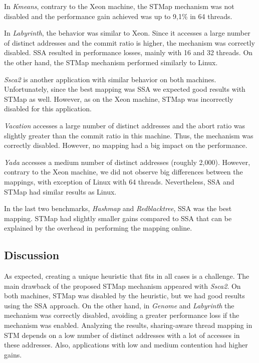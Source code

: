 In \emph{Kmeans}, contrary to the Xeon machine, the STMap mechanism was not disabled and the performance gain achieved was up to 9,1\% in 64 threads. %


In \emph{Labyrinth}, the behavior was similar to Xeon. Since it accesses a large number of distinct addresses and the commit ratio is higher, the mechanism was correctly disabled. SSA resulted in performance losses, mainly with 16 and 32 threads. On the other hand, the STMap mechanism performed similarly to Linux.


\emph{Ssca2} is another application with similar behavior on both machines. Unfortunately, since the best mapping was SSA we expected good results with STMap as well. However, as on the Xeon machine, STMap was incorrectly disabled for this application.


\emph{Vacation} accesses a  large number of distinct addresses and the abort ratio was slightly greater than the commit ratio in this machine. Thus, the mechanism was correctly disabled. However, no mapping had a big impact on the performance.


\emph{Yada} accesses a medium number of distinct addresses (roughly 2,000). However, contrary to the Xeon machine, we did not observe big differences between the mappings, with exception of Linux with 64 threads. Nevertheless, SSA and STMap had similar results as Linux.


In the last two benchmarks, \emph{Hashmap} and \emph{Redblacktree}, SSA was the best mapping. STMap had slightly smaller gains compared to SSA that can be explained by the overhead in performing the mapping online.

\subsection{Discussion}\label{sect:OnlineDiscussion}

As expected, creating a unique heuristic that fits in all cases is a challenge. The main drawback of the proposed STMap mechanism appeared with \emph{Ssca2}. On both machines, STMap was disabled by the heuristic, but we had good results using the SSA approach. On the other hand, in \emph{Genome} and \emph{Labyrinth} the mechanism was correctly disabled, avoiding a greater performance loss if the mechanism was enabled. Analyzing the results, sharing-aware thread mapping in STM depends on a low number of distinct addresses with a lot of accesses in these addresses. Also, applications with low and medium contention had higher gains.

